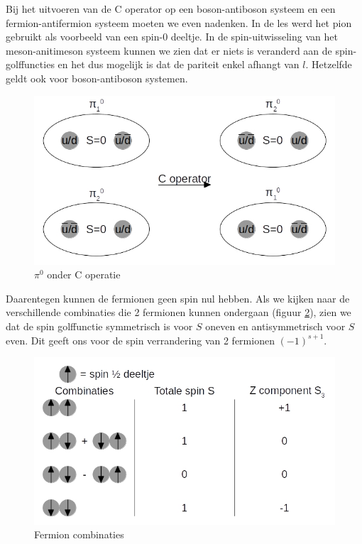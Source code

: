 \documentclass[../main.tex]{subfiles}
\begin{document}
Bij het uitvoeren van de C operator op een boson-antiboson systeem en een fermion-antifermion systeem moeten we even nadenken. In de les werd het pion gebruikt als voorbeeld van een spin-0 deeltje. In de spin-uitwisseling van het meson-anitimeson systeem kunnen we zien dat er niets is veranderd aan de spin-golffuncties en het dus mogelijk is dat de pariteit enkel afhangt van $l$. Hetzelfde geldt ook voor boson-antiboson systemen.

\begin{figure}[h]
    \centering
    \includegraphics[width=0.8\linewidth]{quantum_numbers/baryon_c_operator.jpg}
    \caption{$\pi^0$ onder C operatie}%
    \label{fig:baryon_c_operator}
\end{figure}

Daarentegen kunnen de fermionen geen spin nul hebben. Als we kijken naar de verschillende combinaties die 2 fermionen kunnen ondergaan (figuur \ref{fig:fermion_c_operator}), zien we dat de spin golffunctie symmetrisch is voor $S$ oneven en antisymmetrisch voor $S$ even. Dit geeft ons voor de spin verrandering van 2 fermionen $(-1)^{s+1}$.

\begin{figure}[h]
    \centering
    \includegraphics[width=0.8\linewidth]{quantum_numbers/fermion_c_operator.jpg}
    \caption{Fermion combinaties}%
    \label{fig:fermion_c_operator}
\end{figure}
\end{document}
